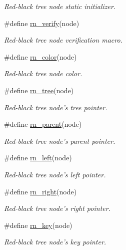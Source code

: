 \begin{CompactItemize}
\begin{CompactList}\small\item\em Red-black tree node static initializer. \item\end{CompactList}\item 
\#define \hyperlink{group__dbprim__rbtree_ga31}{rn\_\-verify}(node)
\begin{CompactList}\small\item\em Red-black tree node verification macro. \item\end{CompactList}\item 
\#define \hyperlink{group__dbprim__rbtree_ga32}{rn\_\-color}(node)
\begin{CompactList}\small\item\em Red-black tree node color. \item\end{CompactList}\item 
\#define \hyperlink{group__dbprim__rbtree_ga33}{rn\_\-tree}(node)
\begin{CompactList}\small\item\em Red-black tree node's tree pointer. \item\end{CompactList}\item 
\#define \hyperlink{group__dbprim__rbtree_ga34}{rn\_\-parent}(node)
\begin{CompactList}\small\item\em Red-black tree node's parent pointer. \item\end{CompactList}\item 
\#define \hyperlink{group__dbprim__rbtree_ga35}{rn\_\-left}(node)
\begin{CompactList}\small\item\em Red-black tree node's left pointer. \item\end{CompactList}\item 
\#define \hyperlink{group__dbprim__rbtree_ga36}{rn\_\-right}(node)
\begin{CompactList}\small\item\em Red-black tree node's right pointer. \item\end{CompactList}\item 
\#define \hyperlink{group__dbprim__rbtree_ga37}{rn\_\-key}(node)
\begin{CompactList}\small\item\em Red-black tree node's key pointer. \item\end{CompactList}\item 

\end{CompactItemize}
